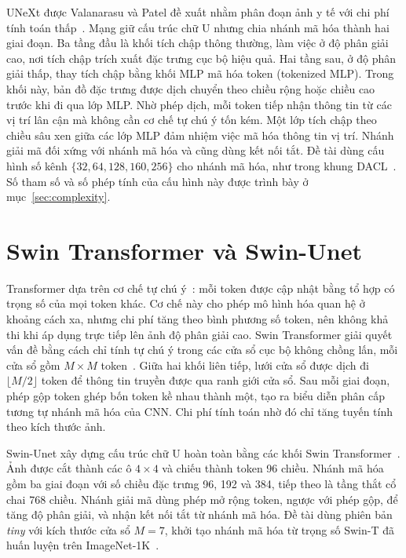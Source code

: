 UNeXt được Valanarasu và Patel đề xuất nhằm phân đoạn ảnh y tế với chi phí tính toán thấp~\cite{valanarasu2022unext}. Mạng giữ cấu trúc chữ U nhưng chia nhánh mã hóa thành hai giai đoạn. Ba tầng đầu là khối tích chập thông thường, làm việc ở độ phân giải cao, nơi tích chập trích xuất đặc trưng cục bộ hiệu quả. Hai tầng sau, ở độ phân giải thấp, thay tích chập bằng khối MLP mã hóa token (tokenized MLP). Trong khối này, bản đồ đặc trưng được dịch chuyển theo chiều rộng hoặc chiều cao trước khi đi qua lớp MLP. Nhờ phép dịch, mỗi token tiếp nhận thông tin từ các vị trí lân cận mà không cần cơ chế tự chú ý tốn kém. Một lớp tích chập theo chiều sâu xen giữa các lớp MLP đảm nhiệm việc mã hóa thông tin vị trí. Nhánh giải mã đối xứng với nhánh mã hóa và cũng dùng kết nối tắt. Đề tài dùng cấu hình số kênh $\{32,64,128,160,256\}$ cho nhánh mã hóa, như trong khung DACL~\cite{wang2026dacl}. Số tham số và số phép tính của cấu hình này được trình bày ở mục~\ref{sec:complexity}.

\section{Swin Transformer và Swin-Unet}
\label{sec:lit-swin}

Transformer dựa trên cơ chế tự chú ý~\cite{vaswani2017attention}: mỗi token được cập nhật bằng tổ hợp có trọng số của mọi token khác. Cơ chế này cho phép mô hình hóa quan hệ ở khoảng cách xa, nhưng chi phí tăng theo bình phương số token, nên không khả thi khi áp dụng trực tiếp lên ảnh độ phân giải cao. Swin Transformer giải quyết vấn đề bằng cách chỉ tính tự chú ý trong các cửa sổ cục bộ không chồng lấn, mỗi cửa sổ gồm $M\times M$ token~\cite{liu2021swin}. Giữa hai khối liên tiếp, lưới cửa sổ được dịch đi $\lfloor M/2\rfloor$ token để thông tin truyền được qua ranh giới cửa sổ. Sau mỗi giai đoạn, phép gộp token ghép bốn token kề nhau thành một, tạo ra biểu diễn phân cấp tương tự nhánh mã hóa của CNN. Chi phí tính toán nhờ đó chỉ tăng tuyến tính theo kích thước ảnh.

Swin-Unet xây dựng cấu trúc chữ U hoàn toàn bằng các khối Swin Transformer~\cite{cao2022swinunet}. Ảnh được cắt thành các ô $4\times4$ và chiếu thành token 96 chiều. Nhánh mã hóa gồm ba giai đoạn với số chiều đặc trưng 96, 192 và 384, tiếp theo là tầng thắt cổ chai 768 chiều. Nhánh giải mã dùng phép mở rộng token, ngược với phép gộp, để tăng độ phân giải, và nhận kết nối tắt từ nhánh mã hóa. Đề tài dùng phiên bản \emph{tiny} với kích thước cửa sổ $M=7$, khởi tạo nhánh mã hóa từ trọng số Swin-T đã huấn luyện trên ImageNet-1K~\cite{deng2009imagenet}.

